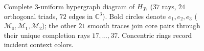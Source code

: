 \documentclass[aps,pra,reprint,superscriptaddress,longbibliography,nofootinbib,floatfix,10pt]{revtex4-2}
\theoremstyle{definition}\newtheorem{definition}[theorem]{Definition}
\theoremstyle{remark}\newtheorem{remark}[theorem]{Remark}
\newcommand{\C}{\mathbb C}\newcommand{\R}{\mathbb R}\newcommand{\Q}{\mathbb Q}
\newcommand{\HesseFCvertex}[2]{%
  \foreach \diskcolor/\diskradius in {#2}{%
    \fill[\diskcolor] (v#1) circle[radius=\diskradius cm];%
  }%
  \fill[white] (v#1) circle[radius=.160cm];%
  \node[sg/number] at (v#1) {#1};%
}
\begin{document}
\begin{figure}[t]
{
}
\caption{Complete $3$-uniform hypergraph diagram of $H_{37}$ ($37$ rays, $24$ orthogonal triads, $72$ edges in $\C^3$). Bold circles denote $e_1,e_2,e_3$ ($\mathcal M_0,\mathcal M_1,\mathcal M_2$); the other $21$ smooth traces join core pairs through their unique completion rays $17,\ldots,37$. Concentric rings record incident context colors.}\label{h:fig:hesse37-hypergraph}
\end{figure}
\end{document}
